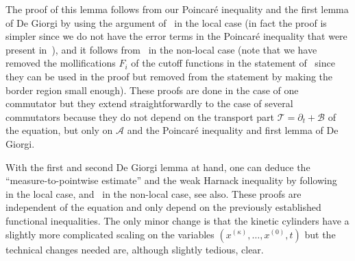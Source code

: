 \documentclass[10pt,a4paper]{amsart}
\theoremstyle{definition}
\newcommand{\cA}{{\mathcal A}}
\newcommand{\cB}{{\mathcal B}}
\newcommand{\cT}{{\mathcal T}}
\begin{document}
The proof of this lemma follows from our Poincaré inequality
and the first lemma of De Giorgi by using the argument
of~\cite[\S 3.2]{guerand-mouhot} in the local case (in
fact the proof is simpler since we do not have the error terms in
the Poincaré inequality that were present
in~\cite{guerand-mouhot}), and it follows
from~\cite[\S 5.2]{loher-2022-preprint-quantitative-de-giorgi}
in the non-local case (note that we have removed the
mollifications $F_i$ of the cutoff functions in the statement
of~\cite{loher-2022-preprint-quantitative-de-giorgi} since they
can be used in the proof but removed from the statement by making the border region small
enough). These proofs are done in the case of one commutator but
they extend straightforwardly to the case of several commutators
because they do not depend on the transport part
$\cT = \partial_t + \cB$ of the equation, but only on $\cA$ and
the Poincaré inequality and first lemma of De Giorgi.

With the first and second De Giorgi lemma at hand, one can deduce
the ``measure-to-pointwise estimate'' and the weak Harnack
inequality by following~\cite{guerand-mouhot} in the local case,
and~\cite{loher-2022-preprint-quantitative-de-giorgi} in the
non-local case, see \cite{APP} also. These proofs are independent of the equation and
only depend on the previously established functional
inequalities. The only minor change is that the kinetic cylinders
have a slightly more complicated scaling on the variables
$(x^{(\kappa)},\dots,x^{(0)},t)$ but the technical changes needed
are, although slightly tedious, clear.
\end{document}
